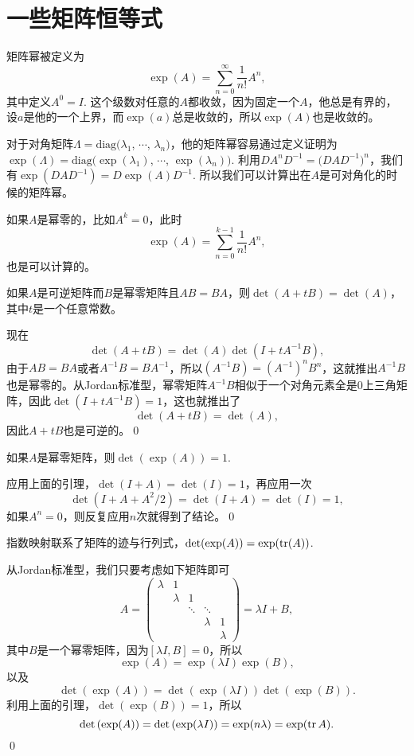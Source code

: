 \documentclass[9pt]{extarticle}
\begin{document}
\newpage

\section{一些矩阵恒等式}

矩阵幂被定义为
\[
	\exp(A)=\sum_{n=0}^\infty \frac{1}{n!}A^n,
\]
其中定义$A^0=I$. 这个级数对任意的$A$都收敛，因为固定一个$A$，他总是有界的，设$a$是他的一个上界，而$\exp(a)$总是收敛的，所以$\exp(A)$也是收敛的。

对于对角矩阵$\Lambda=\mathrm{diag}(\lambda_1$, $\cdots$, $\lambda_n)$，他的矩阵幂容易通过定义证明为$\exp(\Lambda)=\mathrm{diag}(\exp(\lambda_1)$, $\cdots$, $\exp(\lambda_n))$. 利用$DA^nD^{-1}=\bigl(DAD^{-1}\bigr)^n$，我们有$\exp(DAD^{-1})=D\exp(A)D^{-1}$. 所以我们可以计算出在$A$是可对角化的时候的矩阵幂。

如果$A$是幂零的，比如$A^k=0$，此时
\[
	\exp(A)=\sum_{n=0}^{k-1} \frac{1}{n!}A^n,
\]
也是可以计算的。

\lem 如果$A$是可逆矩阵而$B$是幂零矩阵且$AB=BA$，则$\det(A+tB)=\det(A)$，其中$t$是一个任意常数。

\proof 现在
\[
	\det(A+tB)=\det(A)\det(I+tA^{-1}B),
\]
由于$AB=BA$或者$A^{-1}B=BA^{-1}$，所以$(A^{-1}B)=(A^{-1})^n B^n$，这就推出$A^{-1}B$也是幂零的。从Jordan标准型，幂零矩阵$A^{-1}B$相似于一个对角元素全是$0$上三角矩阵，因此$\det(I+tA^{-1}B)=1$，这也就推出了
\[
	\det(A+tB)=\det(A),
\]
因此$A+tB$也是可逆的。\qed

\lem 如果$A$是幂零矩阵，则$\det(\exp(A))=1$.

\proof 应用上面的引理，$\det(I+A)=\det(I)=1$，再应用一次
\[
	\det(I+A+A^2/2)=\det(I+A)=\det(I)=1,
\]
如果$A^n=0$，则反复应用$n$次就得到了结论。\qed

\pro 指数映射联系了矩阵的迹与行列式，$\det(\exp(A))=\exp(\operatorname{tr}(A))$.

\proof 从Jordan标准型，我们只要考虑如下矩阵即可
\[
	A=\begin{pmatrix}
	\lambda &1&&&\\
	&\lambda&1&&\\
	&&\ddots&\ddots&\\
	&&&\lambda&1\\
	&&&&\lambda
	\end{pmatrix}=\lambda I+ B,
\]
其中$B$是一个幂零矩阵，因为$[\lambda I,B]=0$，所以
\[
	\exp(A)=\exp(\lambda I)\exp(B),
\]
以及
\[
	\det \left(\exp(A)\right)=\det\left(\exp(\lambda I)\right)\det\left(\exp(B)\right).
\]
利用上面的引理，$\det\left(\exp(B)\right)=1$，所以
\[
\det \left(\exp(A)\right)=\det\left(\exp(\lambda I)\right)=\exp(n\lambda)=\exp(\operatorname{tr} A).
\]
\qed
\end{document}
